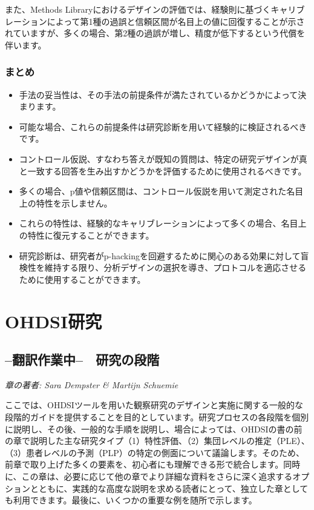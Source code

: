 \documentclass[
  11pt]{book}
\makeatletter
\providecommand{\tightlist}{%
  \setlength{\itemsep}{0pt}\setlength{\parskip}{0pt}}
\newenvironment{kframe}{%
\medskip{}
\setlength{\fboxsep}{.8em}
 \def\at@end@of@kframe{}%
 \ifinner\ifhmode%
  \def\at@end@of@kframe{\end{minipage}}%
  \begin{minipage}{\columnwidth}%
 \fi\fi%
 \def\FrameCommand##1{\hskip\@totalleftmargin \hskip-\fboxsep
 \colorbox{myShadeColor}{##1}\hskip-\fboxsep
     \hskip-\linewidth \hskip-\@totalleftmargin \hskip\columnwidth}%
 \MakeFramed {\advance\hsize-\width
   \@totalleftmargin\z@ \linewidth\hsize
   \@setminipage}}%
 {\par\unskip\endMakeFramed%
 \at@end@of@kframe}
\newenvironment{rmdblock}[1]
  {
  \begin{itemize}
  \renewcommand{\labelitemi}{
    \raisebox{-.7\height}[0pt][0pt]{
      {\setkeys{Gin}{width=3em,keepaspectratio}\texttt{[image: images/\#1]}}
    }
  }
  \setlength{\fboxsep}{1em}
  \begin{kframe}
  \item
  }
  {
  \end{kframe}
  \end{itemize}
  }
\newenvironment{rmdsummary}
  {\begin{rmdblock}{summary}}
  {\end{rmdblock}}
\theoremstyle{definition}
\theoremstyle{definition}
\theoremstyle{definition}
\theoremstyle{definition}
\theoremstyle{remark}
\makeatother
\begin{document}
また、Methods Libraryにおけるデザインの評価では、経験則に基づくキャリブレーションによって第1種の過誤と信頼区間が名目上の値に回復することが示されていますが、多くの場合、第2種の過誤が増し、精度が低下するという代償を伴います。

\section{まとめ}\label{ux307eux3068ux3081-14}

\begin{rmdsummary}
\begin{itemize}
\tightlist
\item
  手法の妥当性は、その手法の前提条件が満たされているかどうかによって決まります。
\item
  可能な場合、これらの前提条件は研究診断を用いて経験的に検証されるべきです。
\item
  コントロール仮説、すなわち答えが既知の質問は、特定の研究デザインが真と一致する回答を生み出すかどうかを評価するために使用されるべきです。
\item
  多くの場合、p値や信頼区間は、コントロール仮説を用いて測定された名目上の特性を示しません。
\item
  これらの特性は、経験的なキャリブレーションによって多くの場合、名目上の特性に復元することができます。
\item
  研究診断は、研究者がp-hackingを回避するために関心のある効果に対して盲検性を維持する限り、分析デザインの選択を導き、プロトコルを適応させるために使用することができます。
\end{itemize}
\end{rmdsummary}

\part{OHDSI研究}\label{part-ohdsiux7814ux7a76}

\chapter{--翻訳作業中--　研究の段階}\label{StudySteps}

\emph{章の著者: Sara Dempster \& Martijn Schuemie}

ここでは、OHDSIツールを用いた観察研究のデザインと実施に関する一般的な段階的ガイドを提供することを目的としています。研究プロセスの各段階を個別に説明し、その後、一般的な手順を説明し、場合によっては、OHDSIの書の前の章で説明した主な研究タイプ（1）特性評価、（2）集団レベルの推定（PLE）、（3）患者レベルの予測（PLP）の特定の側面について議論します。そのため、前章で取り上げた多くの要素を、初心者にも理解できる形で統合します。同時に、この章は、必要に応じて他の章でより詳細な資料をさらに深く追求するオプションとともに、実践的な高度な説明を求める読者にとって、独立した章としても利用できます。最後に、いくつかの重要な例を随所で示します。
\end{document}
